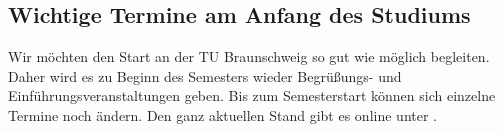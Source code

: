 
\subsection{Wichtige Termine am Anfang des Studiums}


Wir möchten den Start an der TU Braunschweig so gut wie möglich begleiten. Daher wird es zu Beginn des Semesters wieder Begrüßungs- und Einführungsveranstaltungen geben. Bis zum Semesterstart können sich einzelne Termine noch ändern. Den ganz aktuellen Stand gibt es online unter .

\renewcommand{\labelitemi}{$\bullet$}
\renewcommand{\labelitemii}{$\bullet$}
\renewcommand{\labelitemiii}{$\bullet$}
\renewcommand{\labelitemiv}{$\bullet$}

